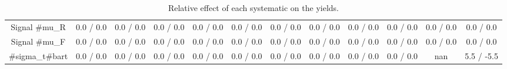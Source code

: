\begin{table}[htbp]
\begin{center}
\begin{tabular}{|c|c|c|c|c|c|c|c|c|c|c|c|}
  Signal #mu_{R} & 0.0 / 0.0 & 0.0 / 0.0 & 0.0 / 0.0 & 0.0 / 0.0 & 0.0 / 0.0 & 0.0 / 0.0 & 0.0 / 0.0 & 0.0 / 0.0 & 0.0 / 0.0 & 0.0 / 0.0 & 0.0 / 0.0 \\ 
  Signal #mu_{F} & 0.0 / 0.0 & 0.0 / 0.0 & 0.0 / 0.0 & 0.0 / 0.0 & 0.0 / 0.0 & 0.0 / 0.0 & 0.0 / 0.0 & 0.0 / 0.0 & 0.0 / 0.0 & 0.0 / 0.0 & 0.0 / 0.0 \\ 
  #sigma_{t#bar{t}} & 0.0 / 0.0 & 0.0 / 0.0 & 0.0 / 0.0 & 0.0 / 0.0 & 0.0 / 0.0 & 0.0 / 0.0 & 0.0 / 0.0 & 0.0 / 0.0 & 0.0 / 0.0 &    nan    & 5.5 / -5.5 \\ 
\hline 
\end{tabular} 
\caption{Relative effect of each systematic on the yields.} 
\end{center} 
\end{table} 
